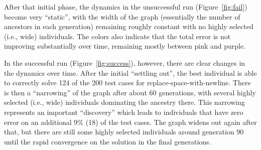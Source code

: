 \documentclass{sig-alternate}
\begin{document}
After that initial phase, the dynamics in the unsuccessful run (Figure~\ref{fig:fail}) become very ``static'', with the width of the graph (essentially the number of ancestors in each generation) remaining roughly constant with no highly selected (i.e., wide) individuals. The colors also indicate that the total error is not improving substantially over time, remaining mostly between pink and purple.

In the successful run (Figure~\ref{fig:success}), however, there are clear changes in the dynamics over time. After the initial ``settling out'', the best individual is able to correctly solve 124 of the 200 test cases for replace-space-with-newline. There is then a ``narrowing'' of the graph after about 60 generations, with several highly selected (i.e., wide) individuals dominating the ancestry there. This narrowing represents an important ``discovery'' which leads to individuals that have zero error on an additional 9\% (18) of the test cases. The graph widens out again after that, but there are still some highly selected individuals around generation 90 until the rapid convergence on the solution in the final generations.






\end{document}
